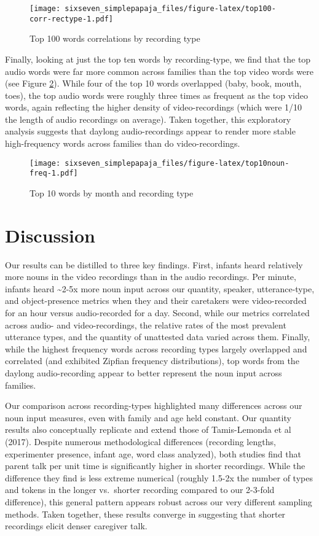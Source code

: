 \documentclass[floatsintext,man]{apa6}
\theoremstyle{definition}
\theoremstyle{definition}
\theoremstyle{definition}
\theoremstyle{remark}
\begin{document}
\begin{figure}
\centering
\texttt{[image: sixseven\_simplepapaja\_files/figure-latex/top100-corr-rectype-1.pdf]}
\caption{\label{fig:top100-corr-rectype}Top 100 words correlations by
recording type}
\end{figure}

Finally, looking at just the top ten words by recording-type, we find
that the top audio words were far more common across families than the
top video words were (see Figure \ref{fig:top10noun-freq}). While four
of the top 10 words overlapped (baby, book, mouth, toes), the top audio
words were roughly three times as frequent as the top video words, again
reflecting the higher density of video-recordings (which were 1/10 the
length of audio recordings on average). Taken together, this exploratory
analysis suggests that daylong audio-recordings appear to render more
stable high-frequency words across families than do video-recordings.

\begin{figure}
\centering
\texttt{[image: sixseven\_simplepapaja\_files/figure-latex/top10noun-freq-1.pdf]}
\caption{\label{fig:top10noun-freq}Top 10 words by month and recording type}
\end{figure}

\hypertarget{discussion}{%
\section{Discussion}\label{discussion}}

Our results can be distilled to three key findings. First, infants heard
relatively more nouns in the video recordings than in the audio
recordings. Per minute, infants heard \textasciitilde{}2-5x more noun
input across our quantity, speaker, utterance-type, and object-presence
metrics when they and their caretakers were video-recorded for an hour
versus audio-recorded for a day. Second, while our metrics correlated
across audio- and video-recordings, the relative rates of the most
prevalent utterance types, and the quantity of unattested data varied
across them. Finally, while the highest frequency words across recording
types largely overlapped and correlated (and exhibited Zipfian frequency
distributions), top words from the daylong audio-recording appear to
better represent the noun input across families.

Our comparison across recording-types highlighted many differences
across our noun input measures, even with family and age held constant.
Our quantity results also conceptually replicate and extend those of
Tamis-Lemonda et al (2017). Despite numerous methodological differences
(recording lengths, experimenter presence, infant age, word class
analyzed), both studies find that parent talk per unit time is
significantly higher in shorter recordings. While the difference they
find is less extreme numerical (roughly 1.5-2x the number of types and
tokens in the longer vs.~shorter recording compared to our 2-3-fold
difference), this general pattern appears robust across our very
different sampling methods. Taken together, these results converge in
suggesting that shorter recordings elicit denser caregiver talk.
\end{document}

